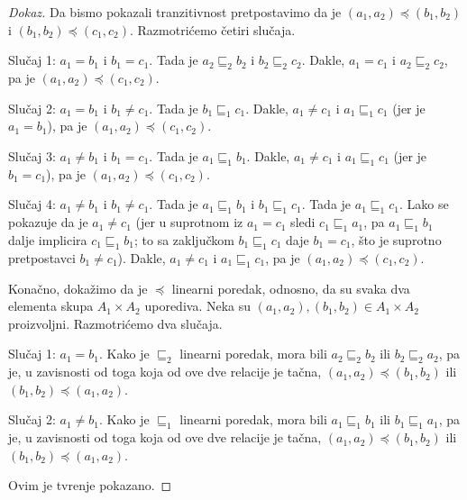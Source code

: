 \begin{proof}[Dokaz]
  \medskip
  
  Da bismo pokazali tranzitivnost pretpostavimo da je $(a_1, a_2) \preccurlyeq (b_1, b_2)$ i $(b_1, b_2) \preccurlyeq (c_1, c_2)$.
  Razmotri\'cemo \v cetiri slu\v caja.
  
  \medskip
  
  Slu\v caj 1: $a_1 = b_1$ i $b_1 = c_1$. Tada je $a_2 \mathrel{\sqsubseteq_2} b_2$ i $b_2 \mathrel{\sqsubseteq_2} c_2$.
  Dakle, $a_1 = c_1$ i $a_2 \mathrel{\sqsubseteq_2} c_2$, pa je $(a_1, a_2) \preccurlyeq (c_1, c_2)$.
  
  \medskip

  Slu\v caj 2: $a_1 = b_1$ i $b_1 \ne c_1$. Tada je $b_1 \mathrel{\sqsubseteq_1} c_1$.
  Dakle, $a_1 \ne c_1$ i $a_1 \mathrel{\sqsubseteq_1} c_1$ (jer je $a_1 = b_1$), pa je $(a_1, a_2) \preccurlyeq (c_1, c_2)$.

  \medskip

  Slu\v caj 3: $a_1 \ne b_1$ i $b_1 = c_1$. Tada je $a_1 \mathrel{\sqsubseteq_1} b_1$.
  Dakle, $a_1 \ne c_1$ i $a_1 \mathrel{\sqsubseteq_1} c_1$ (jer je $b_1 = c_1$), pa je $(a_1, a_2) \preccurlyeq (c_1, c_2)$.

  \medskip

  Slu\v caj 4: $a_1 \ne b_1$ i $b_1 \ne c_1$. Tada je $a_1 \mathrel{\sqsubseteq_1} b_1$ i $b_1 \mathrel{\sqsubseteq_1} c_1$.
  Tada je $a_1 \mathrel{\sqsubseteq_1} c_1$. Lako se pokazuje da je $a_1 \ne c_1$
  (jer u suprotnom iz $a_1 = c_1$ sledi $c_1 \mathrel{\sqsubseteq_1} a_1$, pa $a_1 \mathrel{\sqsubseteq_1} b_1$ dalje implicira $c_1 \mathrel{\sqsubseteq_1} b_1$;
  to sa zaklju\v ckom $b_1 \mathrel{\sqsubseteq_1} c_1$ daje $b_1 = c_1$, \v sto je suprotno pretpostavci $b_1 \ne c_1$).
  Dakle, $a_1 \ne c_1$ i $a_1 \mathrel{\sqsubseteq_1} c_1$, pa je $(a_1, a_2) \preccurlyeq (c_1, c_2)$.
  
  \medskip
  
  Kona\v cno, doka\v zimo da je $\preccurlyeq$ linearni poredak, odnosno, da su svaka dva elementa skupa $A_1 \times A_2$
  uporediva. Neka su $(a_1, a_2), (b_1, b_2) \in A_1 \times A_2$ proizvoljni. Razmotri\'cemo dva slu\v caja.
  
  \medskip
  
  Slu\v caj 1: $a_1 = b_1$. Kako je $\sqsubseteq_2$ linearni poredak, mora bili $a_2 \mathrel{\sqsubseteq_2} b_2$
  ili $b_2 \mathrel{\sqsubseteq_2} a_2$, pa je, u zavisnosti od toga koja od ove dve relacije je ta\v cna,
  $(a_1, a_2) \preccurlyeq (b_1, b_2)$ ili $(b_1, b_2) \preccurlyeq (a_1, a_2)$.
  
  \medskip
  
  Slu\v caj 2: $a_1 \ne b_1$. Kako je $\sqsubseteq_1$ linearni poredak, mora bili $a_1 \mathrel{\sqsubseteq_1} b_1$
  ili $b_1 \mathrel{\sqsubseteq_1} a_1$, pa je, u zavisnosti od toga koja od ove dve relacije je ta\v cna,
  $(a_1, a_2) \preccurlyeq (b_1, b_2)$ ili $(b_1, b_2) \preccurlyeq (a_1, a_2)$.
  
  \medskip
  
  Ovim je tvr\dj enje pokazano.
\end{proof}


